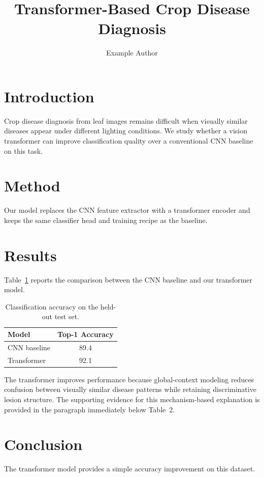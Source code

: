 \documentclass{article}
\title{Transformer-Based Crop Disease Diagnosis}
\author{Example Author}
\date{}
\begin{document}
\maketitle

\section{Introduction}
Crop disease diagnosis from leaf images remains difficult when visually similar diseases appear under different lighting conditions. We study whether a vision transformer can improve classification quality over a conventional CNN baseline on this task.

\section{Method}
Our model replaces the CNN feature extractor with a transformer encoder and keeps the same classifier head and training recipe as the baseline.

\section{Results}
Table~\ref{tab:main-results} reports the comparison between the CNN baseline and our transformer model.

\begin{table}[h]
\centering
\caption{Classification accuracy on the held-out test set.}
\label{tab:main-results}
\begin{tabular}{lc}
\toprule
Model & Top-1 Accuracy \\
\midrule
CNN baseline & 89.4 \\
Transformer & 92.1 \\
\bottomrule
\end{tabular}
\end{table}

The transformer improves performance because global-context modeling reduces confusion between visually similar disease patterns while retaining discriminative lesion structure. The supporting evidence for this mechanism-based explanation is provided in the paragraph immediately below Table~2.

\section{Conclusion}
The transformer model provides a simple accuracy improvement on this dataset.
\end{document}
